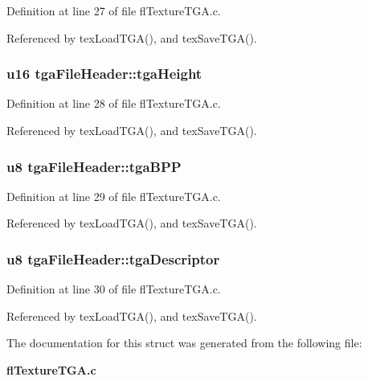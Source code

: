 Definition at line 27 of file fl\-Texture\-TGA.c.

Referenced by tex\-Load\-TGA(), and tex\-Save\-TGA().
\subsubsection{\setlength{\rightskip}{0pt plus 5cm}u16 {\bf tga\-File\-Header::tga\-Height}}\label{structtgaFileHeader_338d5c5c83f3ad91685a10bb0c149cfc}




Definition at line 28 of file fl\-Texture\-TGA.c.

Referenced by tex\-Load\-TGA(), and tex\-Save\-TGA().
\subsubsection{\setlength{\rightskip}{0pt plus 5cm}u8 {\bf tga\-File\-Header::tga\-BPP}}\label{structtgaFileHeader_559de26dfe2484241d638526b0da16b6}




Definition at line 29 of file fl\-Texture\-TGA.c.

Referenced by tex\-Load\-TGA(), and tex\-Save\-TGA().
\subsubsection{\setlength{\rightskip}{0pt plus 5cm}u8 {\bf tga\-File\-Header::tga\-Descriptor}}\label{structtgaFileHeader_164ab2fa9e9c1bc460dfeaf98a949fb3}




Definition at line 30 of file fl\-Texture\-TGA.c.

Referenced by tex\-Load\-TGA(), and tex\-Save\-TGA().

The documentation for this struct was generated from the following file:\begin{CompactItemize}
\item 
{\bf fl\-Texture\-TGA.c}\end{CompactItemize}

